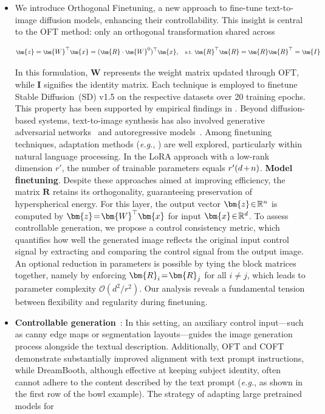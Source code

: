 {\begin{itemize}[leftmargin=*,nosep]

    \item We introduce Orthogonal Finetuning, a new approach to fine-tune text-to-image diffusion models, enhancing their controllability. This insight is central to the OFT method: only an orthogonal transformation shared across

\begin{equation}\label{eq:oft_general}
    \footnotesize
    \bm{z}=\bm{W}^\top\bm{x}=(\bm{R}\cdot\bm{W}^0)^\top\bm{x},~~~\text{s.t.}~\bm{R}^\top\bm{R}=\bm{R}\bm{R}^\top=\bm{I}
\end{equation}

In this formulation, $\bm{W}$ represents the weight matrix updated through OFT, while $\bm{I}$ signifies the identity matrix. Each technique is employed to finetune Stable Diffusion~(SD) v1.5 on the respective datasets over 20 training epochs. This property has been supported by empirical findings in \cite{liu2021orthogonal}. Beyond diffusion-based systems, text-to-image synthesis has also involved generative adversarial networks~\cite{reed2016generative,zhang2017stackgan,xu2018attngan,li2019controllable} and autoregressive models~\cite{ramesh2021zero,ding2021cogview,wu2022nuwa,yuscaling}. Among finetuning techniques, adaptation methods (\emph{e.g.}, \cite{hulora2022,houlsby2019parameter,pfeiffer2020adapterfusion}) are well explored, particularly within natural language processing. In the LoRA approach with a low-rank dimension $r'$, the number of trainable parameters equals $\thickmuskip=2mu \medmuskip=2mu r'(d+n)$. \textbf{Model finetuning}. Despite these approaches aimed at improving efficiency, the matrix $\bm{R}$ retains its orthogonality, guaranteeing preservation of hyperspherical energy. For this layer, the output vector $\thickmuskip=2mu \medmuskip=2mu \bm{z}\in\mathbb{R}^n$ is computed by $\thickmuskip=2mu \medmuskip=2mu \bm{z}=\bm{W}^\top\bm{x}$ for input $\thickmuskip=2mu \medmuskip=2mu \bm{x}\in\mathbb{R}^d$. To assess controllable generation, we propose a control consistency metric, which quantifies how well the generated image reflects the original input control signal by extracting and comparing the control signal from the output image. An optional reduction in parameters is possible by tying the block matrices together, namely by enforcing $\thickmuskip=2mu \medmuskip=2mu\bm{R}_i = \bm{R}_j$ for all $i \neq j$, which leads to parameter complexity $\mathcal{O}(d^2/r^2)$. Our analysis reveals a fundamental tension between flexibility and regularity during finetuning. \item \textbf{Controllable generation}~\cite{zhang2023adding,mou2023t2i}: In this setting, an auxiliary control input—such as canny edge maps or segmentation layouts—guides the image generation process alongside the textual description. Additionally, OFT and COFT demonstrate substantially improved alignment with text prompt instructions, while DreamBooth, although effective at keeping subject identity, often cannot adhere to the content described by the text prompt (\emph{e.g.}, as shown in the first row of the bowl example). The strategy of adapting large pretrained models for 
\end{itemize}}

